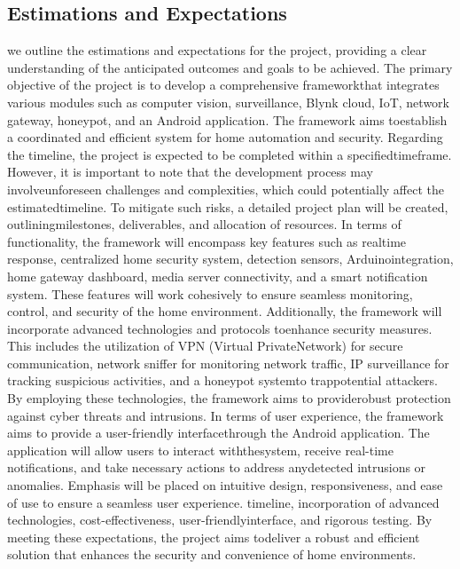 \documentclass[letterpaper, 10 pt, conference]{ieeeconf}  %
\begin{document}
\subsection{Estimations and Expectations}
we outline the estimations and expectations for the project, providing a clear
understanding of the anticipated outcomes and goals to be achieved. The primary objective of the project is to develop a comprehensive frameworkthat
integrates various modules such as computer vision, surveillance, Blynk cloud, IoT, network gateway, honeypot, and an Android application. The framework aims toestablish a coordinated and efficient system for home automation and security. Regarding the timeline, the project is expected to be completed within a specifiedtimeframe. However, it is important to note that the development process may involveunforeseen challenges and complexities, which could potentially affect the estimatedtimeline. To mitigate such risks, a detailed project plan will be created, outliningmilestones, deliverables, and allocation of resources. In terms of functionality, the framework will encompass key features such as realtime response, centralized home security system, detection sensors, Arduinointegration, home gateway dashboard, media server connectivity, and a smart
notification system. These features will work cohesively to ensure seamless
monitoring, control, and security of the home environment. Additionally, the framework will incorporate advanced technologies and protocols toenhance security measures. This includes the utilization of VPN (Virtual PrivateNetwork) for secure communication, network sniffer for monitoring network traffic, IP surveillance for tracking suspicious activities, and a honeypot systemto trappotential attackers. By employing these technologies, the framework aims to providerobust protection against cyber threats and intrusions. In terms of user experience, the framework aims to provide a user-friendly interfacethrough the Android application. The application will allow users to interact withthesystem, receive real-time notifications, and take necessary actions to address anydetected intrusions or anomalies. Emphasis will be placed on intuitive design, responsiveness, and ease of use to ensure a seamless user experience. timeline, incorporation of advanced technologies, cost-effectiveness, user-friendlyinterface, and rigorous testing. By meeting these expectations, the project aims todeliver a robust and efficient solution that enhances the security and convenience of
home environments.
\end{document}

